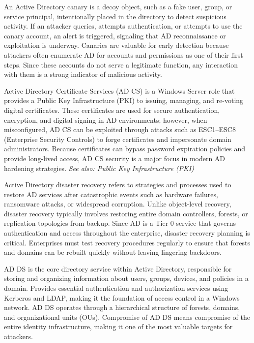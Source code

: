  An Active Directory canary is a decoy object, such as a fake user, group, or service principal, intentionally placed in the directory to detect suspicious activity. If an attacker queries, attempts authentication, or attempts to use the canary account, an alert is triggered, signaling that AD reconnaissance or exploitation is underway. Canaries are valuable for early detection because attackers often enumerate AD for accounts and permissions as one of their first steps. Since these accounts do not serve a legitimate function, any interaction with them is a strong indicator of malicious activity.

 Active Directory Certificate Services (AD CS) is a Windows Server role that provides a Public Key Infrastructure (PKI) to issuing, managing, and re-voting digital certificates. These certificates are used for secure authentication, encryption, and digital signing in AD environments; however, when misconfigured, AD CS can be exploited through attacks such as ESC1–ESC8 (Enterprise Security Controls) to forge certificates and impersonate domain administrators. Because certificates can bypass password expiration policies and provide long-lived access, AD CS security is a major focus in modern AD hardening strategies.
\textit{See also: Public Key Infrastructure (PKI)}

 Active Directory disaster recovery refers to strategies and processes used to restore AD services after catastrophic events such as hardware failures, ransomware attacks, or widespread corruption. Unlike object-level recovery, disaster recovery typically involves restoring entire domain controllers, forests, or replication topologies from backup. Since AD is a Tier 0 service that governs authentication and access throughout the enterprise, disaster recovery planning is critical. Enterprises must test recovery procedures regularly to ensure that forests and domains can be rebuilt quickly without leaving lingering backdoors.

 AD DS is the core directory service within Active Directory, responsible for storing and organizing information about users, groups, devices, and policies in a domain. Provides essential authentication and authorization services using Kerberos and LDAP, making it the foundation of access control in a Windows network. AD DS operates through a hierarchical structure of forests, domains, and organizational units (OUs). Compromise of AD DS means compromise of the entire identity infrastructure, making it one of the most valuable targets for attackers.

